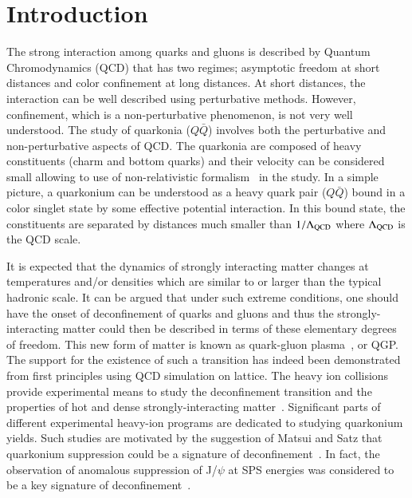 \newpage
\section{Introduction}
\label{sec:Introduction}


The strong interaction among quarks and gluons is described by
Quantum Chromodynamics (QCD) that has two regimes; asymptotic freedom at short
distances and color confinement at long distances.
At short distances, the interaction can be well described using perturbative methods. 
However, confinement, which is a non-perturbative phenomenon, is not 
very well understood. The study of quarkonia ($Q\bar{Q}$) involves
both the perturbative and non-perturbative aspects of QCD. 
The quarkonia are composed of heavy constituents (charm and bottom quarks) and their
velocity can be considered small allowing to use of non-relativistic
formalism~\cite{Povh:1995mua,Ikhdair:2005jf} in the study. 
In a simple picture,  a quarkonium can be understood as a heavy quark pair ($Q\bar{Q}$)
bound in a color singlet state by some effective potential interaction.
In this bound state, the constituents are separated by distances much smaller
than $1/\Lambda_{\rm QCD}$ where $\Lambda_{\rm QCD}$ is the QCD scale.

It is expected that the dynamics of strongly interacting matter changes
at temperatures and/or densities which are similar to or larger than
the typical hadronic scale.
It can be argued that under such extreme conditions, 
one should have the onset of deconfinement of quarks and gluons  and thus the 
strongly-interacting matter could then be described in terms of these
elementary degrees of freedom.
This new form of matter is known as 
quark-gluon plasma~\cite{Shuryak:1980tp,Satz:2011wf}, or QGP.
The support for the existence of such a transition has indeed been demonstrated 
from first principles using QCD simulation on lattice.
The heavy ion collisions provide experimental means to study the deconfinement transition 
and the properties of hot and dense strongly-interacting matter~\cite{Satz:2000bn}.
Significant parts of different experimental heavy-ion programs are dedicated to studying
quarkonium yields. Such studies are 
motivated by the suggestion of  Matsui and Satz
that quarkonium suppression could be a signature of 
deconfinement~\cite{Matsui:1986dk}.
In fact, the observation of anomalous suppression of J/$\psi$ at SPS energies
was considered to be a key signature of deconfinement~\cite{Kluberg:2005yh}.


